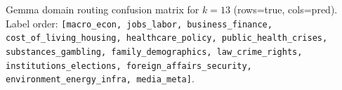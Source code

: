 \begin{table}[h]
\centering
\caption[Gemma domain routing confusion matrix for $k=13$.]{Gemma domain routing confusion matrix for $k=13$ (rows=true, cols=pred). Label order:
\texttt{[macro\_econ, jobs\_labor, business\_finance, cost\_of\_living\_housing, healthcare\_policy, public\_health\_crises, substances\_gambling, family\_demographics, law\_crime\_rights, institutions\_elections, foreign\_affairs\_security, environment\_energy\_infra, media\_meta]}.}
\label{tab:domain_cm_gemma_k12}
\scriptsize
{}
\normalsize
\end{table}

